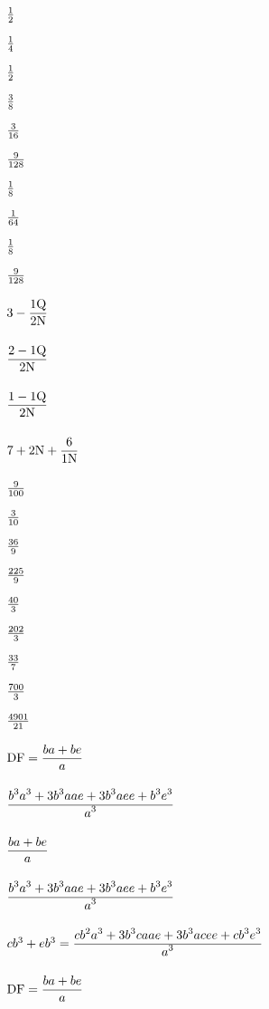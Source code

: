 ${1\over 2}$\par\vfill\eject
${1\over 4}$\par\vfill\eject
${1\over 2}$\par\vfill\eject
${3\over 8}$\par\vfill\eject
${3\over 16}$\par\vfill\eject
${9\over 128}$\par\vfill\eject
${1\over 8}$\par\vfill\eject
${1\over 64}$\par\vfill\eject
${1\over 8}$\par\vfill\eject
${9\over 128}$\par\vfill\eject
$3 - {\displaystyle\strut 1{\rm Q}\over \displaystyle\strut 2{\rm N}}$\par\vfill\eject
${\displaystyle\strut {2 - 1{\rm Q}}\over \displaystyle\strut 2{\rm N}}$\par\vfill\eject
${\displaystyle\strut {1 - 1{\rm Q}}\over \displaystyle\strut 2{\rm N}}$\par\vfill\eject
$7 + 2{\rm N} + {\displaystyle\strut 6\over \displaystyle\strut 1{\rm N}}$\par\vfill\eject
${9\over 100}$\par\vfill\eject
${3\over 10}$\par\vfill\eject
${36\over 9}$\par\vfill\eject
${225\over 9}$\par\vfill\eject
${40\over 3}$\par\vfill\eject
${202\over 3}$\par\vfill\eject
${33\over 7}$\par\vfill\eject
${700\over 3}$\par\vfill\eject
${4901\over 21}$\par\vfill\eject
${\rm DF} = {\displaystyle\strut {ba + be}\over \displaystyle\strut a}$\par\vfill\eject
${\displaystyle\strut {b^{3}a^{3} + 3b^{3}aae + 3b^{3}aee + b^{3}e^{3}}\over \displaystyle\strut a^{3}}$\par\vfill\eject
${\displaystyle\strut {ba + be}\over \displaystyle\strut a}$\par\vfill\eject
${\displaystyle\strut {b^{3}a^{3} + 3b^{3}aae + 3b^{3}aee + b^{3}e^{3}}\over \displaystyle\strut a^{3}}$\par\vfill\eject
$cb^{3} + eb^{3} = {\displaystyle\strut {cb^{2}a^{3} + 3b^{3}caae + 3b^{3}acee + cb^{3}e^{3}}\over \displaystyle\strut a^{3}}$\par\vfill\eject
${\rm DF} = {\displaystyle\strut {ba + be}\over \displaystyle\strut a}$\par\vfill\eject
